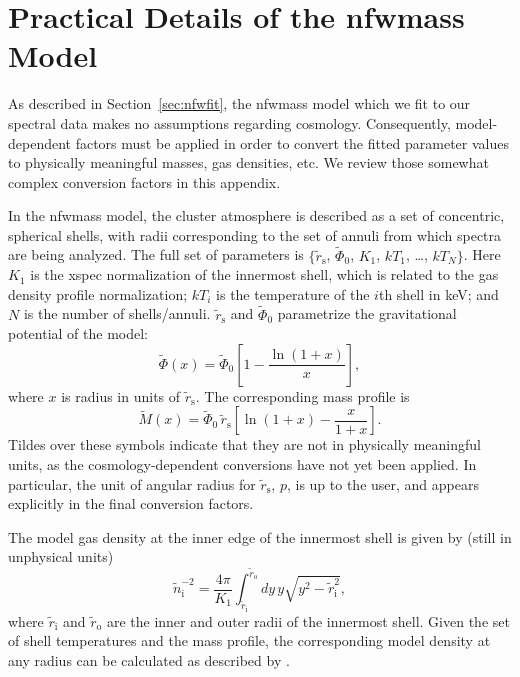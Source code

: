 \documentclass[useAMS,usenatbib,usegraphicx]{mn2e}
\newcommand*{\mysub}[2]{\ensuremath{#1_{\mathrm{#2}}}}
\newcommand*{\sw}[1]{{\sc #1}}
\newcommand*{\secref}{Section}
\newcommand*{\xsmod}[1]{\ensuremath{\widetilde{#1}}}
\newcommand*{\xsrs}{\mysub{\xsmod{r}}{s}}
\newcommand*{\NFW}{\citetalias{Navarro9611107}}
\begin{document}
\appendix


\section{Practical Details of the {\sc nfwmass} Model} \label{sec:nfwmass}

As described in \secref~\ref{sec:nfwfit}, the {\sc nfwmass} model which we fit to our spectral data makes no assumptions regarding cosmology. Consequently, model-dependent factors must be applied in order to convert the fitted parameter values to physically meaningful masses, gas densities, etc. We review those somewhat complex conversion factors in this appendix.

In the {\sc nfwmass} model, the cluster atmosphere is described as a set of concentric, spherical shells, with radii corresponding to the set of annuli from which spectra are being analyzed. The full set of parameters is $\{\xsrs$, $\xsmod{\Phi}_0$, $K_1$, $kT_1$, \ldots, $kT_N\}$. Here $K_1$ is the \sw{xspec} normalization of the innermost shell, which is related to the gas density profile normalization; $kT_i$ is the temperature of the $i$th shell in keV; and $N$ is the number of shells/annuli. $\xsrs$ and $\xsmod{\Phi}_0$ parametrize the gravitational potential of the \NFW{} model:
\begin{equation}
  \xsmod{\Phi}(x) = \xsmod{\Phi}_0 \left[ 1 - \frac{\ln(1+x)}{x} \right],
\end{equation}
where $x$ is radius in units of $\xsrs$.
The corresponding mass profile is
\begin{equation}
  \xsmod{M}(x) = \xsmod{\Phi}_0 \, \xsrs \left[  \ln(1+x) - \frac{x}{1+x} \right].
\end{equation}
Tildes over these symbols indicate that they are not in physically meaningful units, as the cosmology-dependent conversions have not yet been applied. In particular, the unit of angular radius for \xsrs{}, $p$, is up to the user, and appears explicitly in the final conversion factors.

The model gas density at the inner edge of the innermost shell is given by (still in unphysical units)
\begin{equation}
  \xsmod{n}_\mathrm{i}^{-2} = \frac{4 \pi}{K_1} \int_{\xsmod{r}_\mathrm{i}}^{\xsmod{r}_\mathrm{o}} dy \,y \sqrt{y^2 - \xsmod{r}_\mathrm{i}^2},
\end{equation}
where $\xsmod{r}_\mathrm{i}$ and $\xsmod{r}_\mathrm{o}$ are the inner and outer radii of the innermost shell. Given the set of shell temperatures and the mass profile, the corresponding model density at any radius can be calculated as described by \citet{Nulsen1008.2393}.
\end{document}
